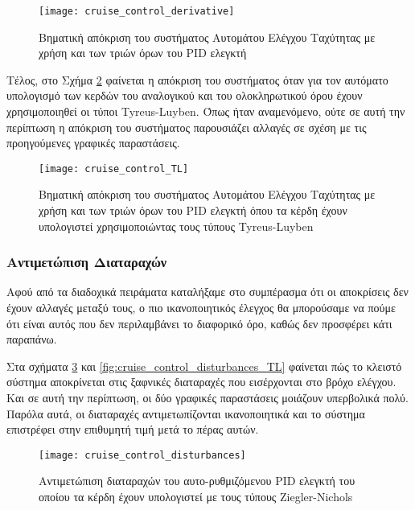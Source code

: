 \begin{figure}[h]
  \centering
  \texttt{[image: cruise\_control\_derivative]}
  \caption{Βηματική απόκριση του συστήματος Αυτομάτου Ελέγχου Ταχύτητας με χρήση και των τριών όρων του PID ελεγκτή}
  \label{fig:cruise_control_derivative}
\end{figure}

Τέλος, στο Σχήμα \ref{fig:cruise_control_TL} φαίνεται η απόκριση του συστήματος όταν για τον αυτόματο υπολογισμό των κερδών του αναλογικού και του ολοκληρωτικού όρου έχουν χρησιμοποιηθεί οι τύποι Tyreus-Luyben. Όπως ήταν αναμενόμενο, ούτε σε αυτή την περίπτωση η απόκριση του συστήματος παρουσιάζει αλλαγές σε σχέση με τις προηγούμενες γραφικές παραστάσεις.

\begin{figure}[h]
  \centering
  \texttt{[image: cruise\_control\_TL]}
  \caption{Βηματική απόκριση του συστήματος Αυτομάτου Ελέγχου Ταχύτητας με χρήση και των τριών όρων του PID ελεγκτή όπου τα κέρδη έχουν υπολογιστεί χρησιμοποιώντας τους τύπους Tyreus-Luyben}
  \label{fig:cruise_control_TL}
\end{figure}

\subsubsection{Αντιμετώπιση Διαταραχών}

Αφού από τα διαδοχικά πειράματα καταλήξαμε στο συμπέρασμα ότι οι αποκρίσεις δεν έχουν αλλαγές μεταξύ τους, ο πιο ικανοποιητικός έλεγχος θα μπορούσαμε να πούμε ότι είναι αυτός που δεν περιλαμβάνει το διαφορικό όρο, καθώς δεν προσφέρει κάτι παραπάνω. 

Στα σχήματα \ref{fig:cruise_control_disturbances} και \ref{fig:cruise_control_disturbances_TL} φαίνεται πώς το κλειστό σύστημα αποκρίνεται στις ξαφνικές διαταραχές που εισέρχονται στο βρόχο ελέγχου. Και σε αυτή την περίπτωση, οι δύο γραφικές παραστάσεις μοιάζουν υπερβολικά πολύ. Παρόλα αυτά, οι διαταραχές αντιμετωπίζονται ικανοποιητικά και το σύστημα επιστρέφει στην επιθυμητή τιμή μετά το πέρας αυτών. 

\begin{figure}[h]
  \centering
  \texttt{[image: cruise\_control\_disturbances]}
  \caption{Αντιμετώπιση διαταραχών του αυτο-ρυθμιζόμενου PID ελεγκτή του οποίου τα κέρδη έχουν υπολογιστεί με τους τύπους Ziegler-Nichols}
  \label{fig:cruise_control_disturbances}
\end{figure}

